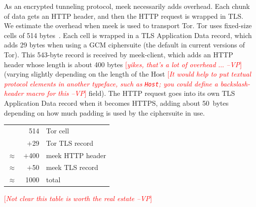\documentclass{sig-alternate}
\newcommand{\meekclient}{\mbox{meek-client}\xspace}
\newcommand{\meek}{meek\xspace}
\newcommand{\note}[1]{{\textcolor{red}{[\textit{#1}]}}}
\newcommand{\vp}[1]{\note{#1 --VP}}
\begin{document}
As an encrypted tunneling protocol, meek necessarily adds overhead.
Each chunk of data gets an HTTP header, and then the HTTP
request is wrapped in TLS.
We estimate the overhead when meek is used to transport Tor.
Tor uses fixed-size cells of 514 bytes~\cite[\S 0.2]{tor-spec}.
Each cell is wrapped in a TLS Application Data record, which adds 29 bytes
when using a GCM ciphersuite (the default in current versions of Tor).
This 543-byte record is received by \meekclient,
which adds an HTTP header whose length is about 400 bytes
\vp{yikes, that's a lot of overhead $\ldots$}
(varying slightly depending on the length of the Host
\vp{It would help to put textual protocol elements in another typeface,
such as \texttt{Host}; you could define a backslash-header macro for this}
field).
The HTTP request goes into its own TLS Application Data record when it becomes HTTPS,
adding about 50~bytes
depending on how much padding is used by the ciphersuite in use.


\begin{center}
\begin{tabular}{r@{}r l}
          &    514 & Tor cell \\
          &  $+$29 & Tor TLS record \\
$\approx$ & $+$400 & \meek HTTP header \\
$\approx$ &  $+$50 & \meek TLS record \\
\hline
$\approx$ &   1000 & total
\end{tabular}
\end{center}
\vp{Not clear this table is worth the real estate}
\end{document}
